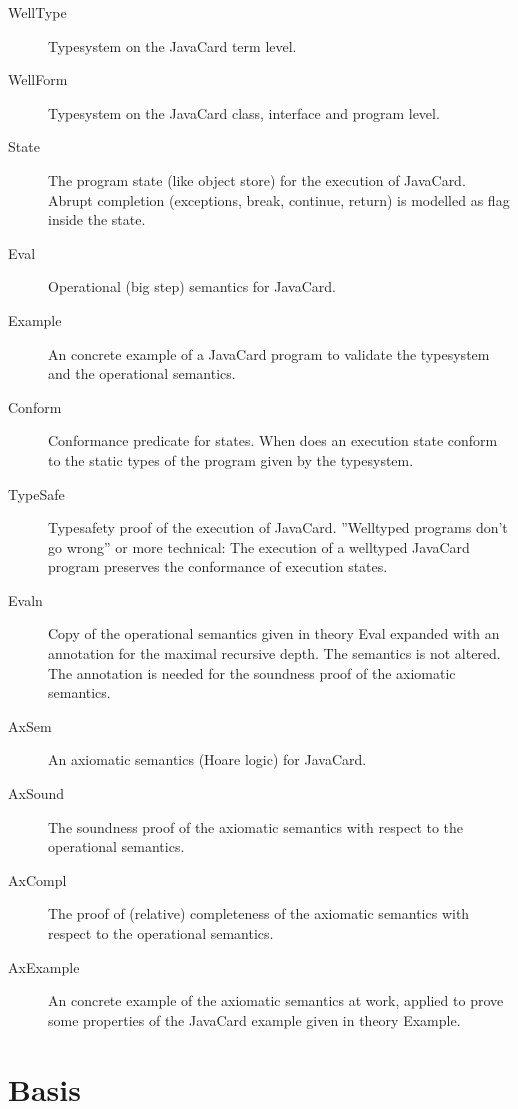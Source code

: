\documentclass[11pt,a4paper]{book}
\begin{document}
\begin{description}
\item[WellType]
Typesystem on the JavaCard term level.

\item[WellForm]
Typesystem on the JavaCard class, interface and program level.

\item[State]
The program state (like object store) for the execution of JavaCard.
Abrupt completion (exceptions, break, continue, return) is modelled as flag
inside the state.

\item[Eval]
Operational (big step) semantics for JavaCard.

\item[Example]
An concrete example of a JavaCard program to validate the typesystem and the
operational semantics.

\item[Conform]
Conformance predicate for states. When does an execution state conform to the
static types of the program given by the typesystem.

\item[TypeSafe]
Typesafety proof of the execution of JavaCard. ''Welltyped programs don't go
wrong'' or more technical: The execution of a welltyped JavaCard program 
preserves the conformance of execution states.

\item[Evaln]
Copy of the operational semantics given in theory Eval expanded with an annotation
for the maximal recursive depth. The semantics is not altered. The annotation
is needed for the soundness proof of the axiomatic semantics.

\item[AxSem]
An axiomatic semantics (Hoare logic) for JavaCard.

\item[AxSound]
The soundness proof of the axiomatic semantics with respect to the operational
semantics.

\item[AxCompl]
The proof of (relative) completeness of the axiomatic semantics with respect
to the operational semantics. 

\item[AxExample]
An concrete example of the axiomatic semantics at work, applied to prove 
some properties of the JavaCard example given in theory Example.
\end{description}


\chapter{Basis}

\end{document}
